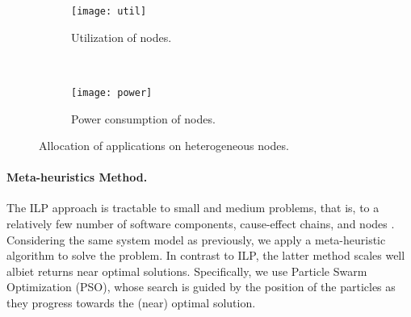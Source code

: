 \begin{figure}
    \centering
    \begin{subfigure}[b]{0.475  \textwidth}
        \texttt{[image: util]}
        \caption{Utilization of nodes.}
        \label{fig_util}
    \end{subfigure}
    ~
        \begin{subfigure}[b]{0.475\textwidth}
        \texttt{[image: power]}
        \caption{Power consumption of nodes.}
        \label{fig_power}
    \end{subfigure}
    \caption{Allocation of applications on heterogeneous nodes.}
    \label{fig_util_power}
\end{figure}

\paragraph{Meta-heuristics Method.} The ILP approach is tractable to small and medium problems, that is, to a relatively few number of software components, cause-effect chains, and nodes \cite{Mahmud5222}. Considering the same system model as previously, we apply a  meta-heuristic algorithm to solve the problem. In contrast to ILP, the latter method scales well albiet returns near optimal solutions. Specifically, we use Particle Swarm Optimization (PSO), whose search is guided by the position of the particles as they progress towards the (near) optimal solution.

